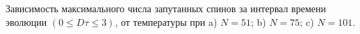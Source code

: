 Зависимость максимального числа запутанных спинов
за интервал времени эволюции $(0 \leq D\tau \leq 3)$,
от температуры при  a) $N=51$; b) $N=75$; c) $N=101$.
